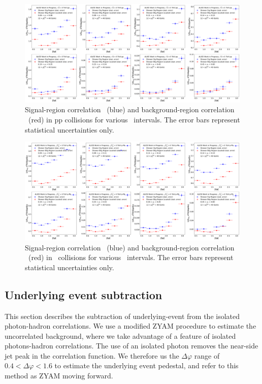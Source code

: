 \begin{figure}
\centering   
    \includegraphics[width = 1.0 \textwidth]{G-H_New/pp_SR_BR_Overlay_pT_0.pdf}
    \caption{Signal-region correlation \CSR~(blue) and background-region correlation \CBR~(red) in pp collisions for various \zt~intervals. The error bars represent statistical uncertainties only.}
    \label{fig:pp_SR_BR_Overlay_pp}
\end{figure}

\begin{figure}
    \centering
    \includegraphics[width = 1.0 \textwidth]{G-H_New/p-Pb_SR_BR_Overlay_pT_0.pdf}
    \caption{Signal-region correlation \CSR~(blue) and background-region correlation \CBR~(red) in \pPb~collisions for various \zt~intervals. The error bars represent statistical uncertainties only.}
    \label{fig:pPb_SR_BR_Overlay_pPb}
\end{figure}
\subsection{Underlying event subtraction}
\label{sec:UncorrBkgnd}

This section describes the subtraction of underlying-event from the isolated photon-hadron correlations. We use a modified ZYAM procedure to estimate the uncorrelated background, where we take advantage of a feature of isolated photons-hadron correlations. The use of an isolated photon removes the near-side jet peak in the correlation function. We therefore us the $\Delta\varphi$ range of $0.4 < \Delta\varphi < 1.6$  to estimate the underlying event pedestal, and refer to this method as ZYAM moving forward.

